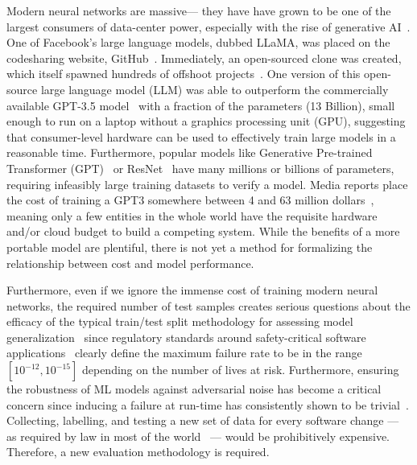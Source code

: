 \documentclass[journal]{IEEEtran}
\begin{document}
Modern neural networks are massive--- they have have grown to be one of the largest consumers of data-center power, especially with the rise of generative AI~\cite{msft_water}.
One of Facebook's large language models, dubbed LLaMA, was placed on the codesharing website, GitHub~\cite{llama}. Immediately, an open-sourced clone was created, which itself spawned hundreds of offshoot projects~\cite{openllama}. One version of this open-source large language model (LLM) was able to outperform the commercially available GPT-3.5 model~\cite{liu2023goat} with a fraction of the parameters (13 Billion), small enough to run on a laptop without a graphics processing unit (GPU), suggesting that consumer-level hardware can be used to effectively train large models in a reasonable time. Furthermore, popular models like Generative Pre-trained Transformer (GPT)~\cite{floridi2020gpt} or ResNet~\cite{resnet} have many millions or billions of parameters, requiring infeasibly large training datasets to verify a model\cite{vcdimension}. Media reports place the cost of training a GPT3 somewhere between 4 and 63 million dollars~\cite{Patel_Ahmad_2023,Feswing_2023}, meaning only a few entities in the whole world have the requisite hardware and/or cloud budget to build a competing system. While the benefits of a more portable model are plentiful, there is not yet a method for formalizing the relationship between cost and model performance.

Furthermore, even if we ignore the immense cost of training modern neural networks, the required number of test samples creates serious questions about the efficacy of the typical train/test split methodology for assessing model generalization~\cite{meyers} since regulatory standards around safety-critical software applications~\cite{IEC61508,iso26262,aviation_software,safetyframework} clearly define the maximum failure rate to be in the range $[10^{-12}, 10^{-15}]$ depending on the number of lives at risk. Furthermore, ensuring the robustness of ML models against adversarial noise has become a critical concern since inducing a failure at run-time has consistently shown to be trivial~\cite{adversarialpatch, carlini_towards_2017, croce_reliable_2020, hopskipjump, chakraborty2018adversarial, art2018}. Collecting, labelling, and testing a new set of data for every software change --- as required by law in most of the world~\cite{IEC61508,iso26262,aviation_software,safetyframework} --- would be prohibitively expensive. Therefore, a new evaluation methodology is required.
\end{document}
